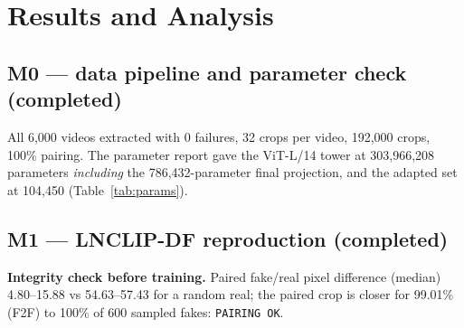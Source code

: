 \documentclass[10pt,a4paper]{article}
\newcommand{\Done}{\textcolor{done}{\textbf{completed}}}
\begin{document}
\section{Results and Analysis}\label{sec:results}

\subsection{M0 --- data pipeline and parameter check (\Done)}
All 6,000 videos extracted with 0 failures, 32 crops per video, 192,000 crops, 100\% pairing. The
parameter report gave the ViT-L/14 tower at 303,966,208 parameters \emph{including} the
786,432-parameter final projection, and the adapted set at 104,450 (Table~\ref{tab:params}).

\subsection{M1 --- LNCLIP-DF reproduction (\Done)}
\textbf{Integrity check before training.} Paired fake/real pixel difference (median) 4.80--15.88
vs 54.63--57.43 for a random real; the paired crop is closer for 99.01\% (F2F) to 100\% of 600
sampled fakes: \texttt{PAIRING OK}.
\end{document}
